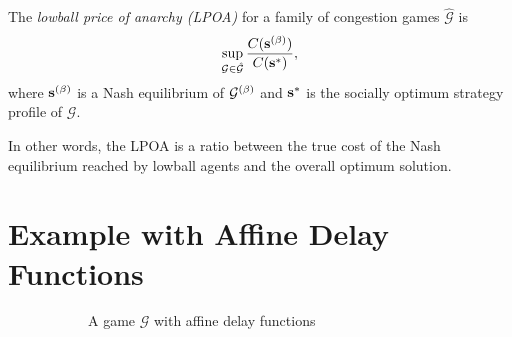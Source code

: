 \documentclass[twoside]{article}
\begin{document}
\begin{multicols}{2}
\begin{defn}
  The \textit{lowball price of anarchy (LPOA)} for a family of congestion games
  $\hat{\mathcal{G}}$ is
  \begin{equation}
    \sup_{\mathcal{G} \in \hat{\mathcal{G}}} \frac{C(\mathbf{s}^{(\beta)})}{C(\mathbf{s}^*)},
    \label{eq:lpoa}
  \end{equation}
  where $\mathbf{s}^{(\beta)}$ is a Nash equilibrium of $\mathcal{G}^{(\beta)}$ and $\mathbf{s}^*$ is the
  socially optimum strategy profile of $\mathcal{G}$.
\end{defn} In other words, the LPOA is a ratio between the true cost of the Nash
equilibrium reached by lowball agents and the overall optimum solution.

\section{Example with Affine Delay Functions}
\begin{figure}[H]
  \centering
  \begin{subfigure}[b]{\linewidth}
    \centering
    \caption{A game $\mathcal{G}$ with affine delay functions}
    \label{fig:affine}
  \end{subfigure}

  \begin{subfigure}[b]{\linewidth}
    \centering
\end{subfigure}
\end{figure}
\end{multicols}
\end{document}
